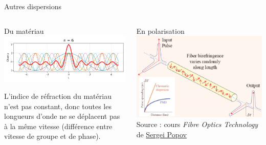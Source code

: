 \documentclass[aspectratio=149, 10pt, t]{beamer}
\begin{document}
\begin{frame}{Autres dispersions}
    \begin{columns}
        \begin{column}{0.5\linewidth}
            \medskip
            \alert{Du matériau}
            \medskip
            \includegraphics[width=\linewidth]{images/pulse_shape}

            L'indice de réfraction du matériau n'est pas constant, donc toutes les longueurs d'onde ne se déplacent pas à la même vitesse (différence entre vitesse de groupe et de phase).
    
        \end{column}
        \begin{column}{0.5\linewidth}
            \medskip
            \vspace{1cm}
            \alert{En polarisation}
            \medskip
            \includegraphics[width=\linewidth]{images/PMD}
            {\footnotesize Source : cours \textit{Fibre Optics Technology} de \href{https://www.imperial.ac.uk/people/s.popov}{Sergei Popov}}

        \end{column}
    \end{columns}
\end{frame}
\end{document}
